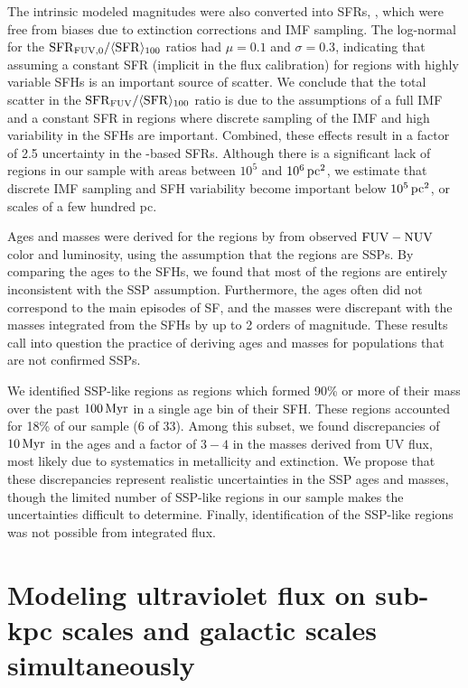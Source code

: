 The intrinsic modeled \fuv{} magnitudes were also converted into SFRs,
\sfrfuvz{}, which were free from biases due to extinction
corrections and IMF sampling. The log-normal for the
$\mathrm{SFR}_{\mathrm{FUV},0} / \langle\mathrm{SFR}\rangle_{100}$ ratios had $\mu=0.1$
and $\sigma=0.3$, indicating that assuming a constant SFR (implicit in the flux
calibration) for regions with highly variable SFHs is an important source of
scatter. We conclude that the total scatter in the $\mathrm{SFR}_{\mathrm{FUV}} / \langle\mathrm{SFR}\rangle_{100}$ ratio
is due to the assumptions of a full IMF and a
constant SFR in regions where discrete sampling of the IMF and high variability
in the SFHs are important. Combined, these effects result in a factor of 2.5
uncertainty in the \fuv{}-based SFRs. Although there is a significant lack of
regions in our sample with areas between $10^5$ and $10^6\,\mathrm{pc}^2$, we
estimate that discrete IMF sampling and SFH variability become important below
$10^5\,\mathrm{pc}^2$, or scales of a few hundred pc.

Ages and masses were derived for the regions by  from
observed $\mathrm{FUV} - \mathrm{NUV}$ color and \fuv{} luminosity, using the assumption that
the regions are SSPs. By comparing the ages to the SFHs, we found that most of
the regions are entirely inconsistent with the SSP assumption. Furthermore, the
ages often did not correspond to the main episodes of SF, and the masses were
discrepant with the masses integrated from the SFHs by up to 2 orders of
magnitude. These results call into question the practice of deriving ages and
masses for populations that are not confirmed SSPs.

We identified SSP-like regions as regions which formed 90\% or more of their
mass over the past $100\,\mathrm{Myr}$ in a single age bin of their SFH. These
regions accounted for 18\% of our sample (6 of 33). Among this subset, we found
discrepancies of $10\,\mathrm{Myr}$ in the ages and a factor of $3-4$ in the
masses derived from UV flux, most likely due to systematics in metallicity and
extinction. We propose that these discrepancies represent realistic
uncertainties in the SSP ages and masses, though the limited number of SSP-like
regions in our sample makes the uncertainties difficult to determine. Finally,
identification of the SSP-like regions was not possible from integrated \fuv{}
flux.



\section{Modeling ultraviolet flux on sub-kpc scales and galactic scales simultaneously}


